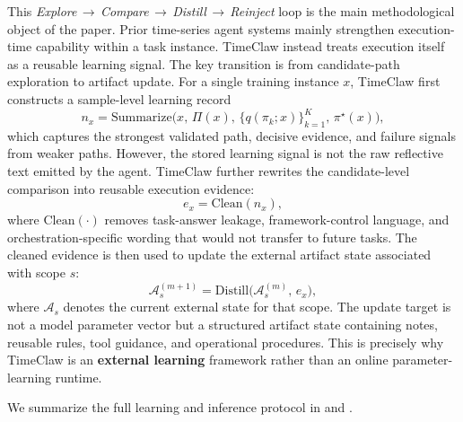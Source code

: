 This \emph{Explore\,$\to$\,Compare\,$\to$\,Distill\,$\to$\,Reinject} loop is the main methodological object of the paper. Prior time-series agent systems mainly strengthen execution-time capability within a task instance. TimeClaw instead treats execution itself as a reusable learning signal. The key transition is from candidate-path exploration to artifact update. For a single training instance $x$, TimeClaw first constructs a sample-level learning record
\begin{equation}
n_x = \mathrm{Summarize}\!\bigl(x,\,\Pi(x),\, \{q(\pi_k;x)\}_{k=1}^{K},\, \pi^\star(x)\bigr),
\end{equation}
which captures the strongest validated path, decisive evidence, and failure signals from weaker paths. However, the stored learning signal is not the raw reflective text emitted by the agent. TimeClaw further rewrites the candidate-level comparison into reusable execution evidence:
\begin{equation}
e_x = \mathrm{Clean}(n_x),
\end{equation}
where $\mathrm{Clean}(\cdot)$ removes task-answer leakage, framework-control language, and orchestration-specific wording that would not transfer to future tasks. The cleaned evidence is then used to update the external artifact state associated with scope $s$:
\begin{equation}
\mathcal{A}_{s}^{(m+1)} = \mathrm{Distill}\!\bigl(\mathcal{A}_{s}^{(m)},\, e_x\bigr),
\end{equation}
where $\mathcal{A}_{s}$ denotes the current external state for that scope. The update target is not a model parameter vector but a structured artifact state containing notes, reusable rules, tool guidance, and operational procedures. This is precisely why TimeClaw is an \textbf{external learning} framework rather than an online parameter-learning runtime.

We summarize the full learning and inference protocol in  and .

